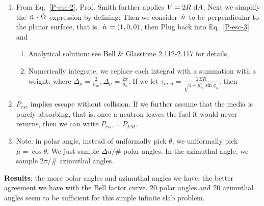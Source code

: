 \documentclass{school-22.211-notes}
\begin{document}
\begin{enumerate}
\item From Eq.~\ref{P-esc-2}, Prof. Smith further applies $V = 2 R \mbox{ }\mathrm{d} A$, 
Next we simplify the $\left. \hat{n} \right. \cdot \left. \hat{\Omega} \right.$ expression by defining: 
Then we consider $\left. \hat{n} \right.$ to be perpendicular to the planar surface, that is, $\left. \hat{n} \right. = (1,0,0)$, then 
Plug back into Eq.~\ref{P-esc-3} and 
\begin{enumerate}
\item Analytical solution: see Bell \& Glasstone 2.112-2.117 for details,
\item Numerically integrate, we replace each integral with a summation with a weight: 
where $\Delta_\mu = \frac{2}{n_m}, \Delta_\mu = \frac{2\pi}{n_\phi}$. If we let $\displaystyle \tau_{m,n} = \frac{2 \Sigma R}{\sqrt{1-\mu_m^2} \sin \phi_n}$, then 
\end{enumerate}

\item $P_{esc}$ implies escape without collision. If we further assume that the media is purely absorbing, that is, once a neutron leaves the fuel it would never returns, then we can write $P_{esc} = P_{FM}$. 

\item Note: in polar angle, instead of uniformally pick $\theta$, we uniformally pick $\mu = \cos \theta$. We just sample $\Delta u /$\# polar angles. In the azimuthal angle, we sample $2\pi$/\# azimuthal angles. 
\end{enumerate}
\textbf{Results}: the more polar angles and azimuthal angles we have, the better agreement we have with the Bell factor curve. 20 polar angles and 20 azimuthal angles seem to be sufficient for this simple infinite slab problem. 
\end{document}

